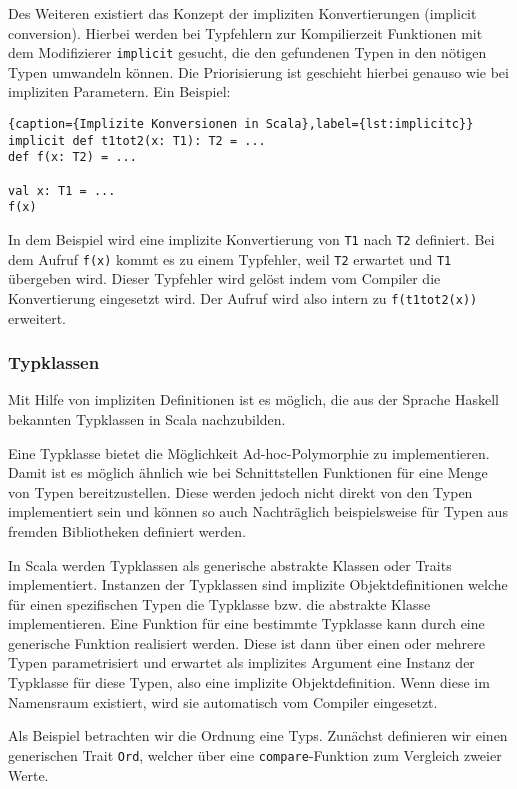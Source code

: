 Des Weiteren existiert das Konzept der impliziten Konvertierungen (implicit conversion). Hierbei
werden bei  Typfehlern zur Kompilierzeit Funktionen mit dem Modifizierer \texttt{implicit}  gesucht,
die den gefundenen Typen in den nötigen Typen umwandeln können.  Die Priorisierung ist geschieht
hierbei genauso wie bei impliziten Parametern. Ein Beispiel:

\begin{lstlisting}{caption={Implizite Konversionen in Scala},label={lst:implicitc}}
implicit def t1tot2(x: T1): T2 = ...
def f(x: T2) = ...

val x: T1 = ...
f(x)
\end{lstlisting}

In dem Beispiel wird eine implizite Konvertierung von \texttt{T1} nach \texttt{T2}  definiert. Bei
dem Aufruf \texttt{f(x)} kommt es zu einem Typfehler, weil  \texttt{T2} erwartet und \texttt{T1}
übergeben wird. Dieser Typfehler wird  gelöst indem vom Compiler die Konvertierung eingesetzt wird.
Der Aufruf wird also intern zu \texttt{f(t1tot2(x))} erweitert.

\subsubsection{Typklassen}

Mit Hilfe von impliziten Definitionen ist es möglich, die aus der Sprache Haskell  bekannten
Typklassen in Scala nachzubilden.

Eine Typklasse bietet die Möglichkeit Ad-hoc-Polymorphie zu implementieren. Damit ist es möglich
ähnlich wie bei Schnittstellen Funktionen für eine Menge von Typen bereitzustellen. Diese werden
jedoch nicht direkt von den Typen implementiert sein und können so auch Nachträglich beispielsweise
für Typen aus fremden Bibliotheken definiert werden.

In Scala werden Typklassen als generische abstrakte Klassen oder Traits implementiert. Instanzen der
Typklassen sind implizite Objektdefinitionen welche für einen spezifischen Typen die Typklasse bzw.
die abstrakte Klasse implementieren. Eine Funktion für eine bestimmte Typklasse kann durch eine
generische Funktion  realisiert werden. Diese ist dann über einen oder mehrere Typen parametrisiert
und erwartet als implizites Argument eine Instanz der Typklasse für diese Typen,  also eine
implizite Objektdefinition. Wenn diese im Namensraum existiert, wird  sie automatisch vom Compiler
eingesetzt.

Als Beispiel betrachten wir die Ordnung eine Typs. Zunächst definieren wir einen generischen Trait
\texttt{Ord}, welcher über eine \texttt{compare}-Funktion zum Vergleich zweier Werte.

